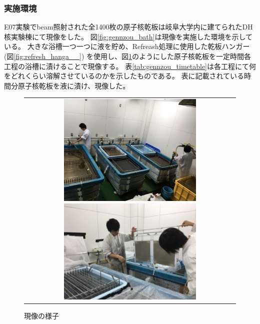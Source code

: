 \documentclass[12pt,a4paper]{jarticle}
\begin{document}
\subsubsection{実施環境}
E07実験でbeam照射された全1400枚の原子核乾板は岐阜大学内に建てられたDH核実験棟にて現像をした。
図\ref{fig:gennzou_bath}は現像を実施した環境を示している。
大きな浴槽一つ一つに液を貯め、Refreash処理に使用した乾板ハンガー(図\ref{fig:refresh_hanga__})
を使用し、図\ref{fig:emulsion_turusi}のようにした原子核乾板を一定時間各工程の浴槽に漬けることで現像する。
表\ref{tab:gennzou_timetable}は各工程にて何をどれくらい溶解させているのかを示したものである。
表に記載されている時間分原子核乾板を液に漬け、現像した。
\begin{figure}[htbp]
  \centering
      \begin{tabular}{c}
        \begin{minipage}{0.5\hsize}
          \centering
            \includegraphics[clip, width=70mm]{gennzou_condition.png}
            \hspace{1.6cm} 
            \caption{現像環境\label{fig:gennzou_bath}}
        \end{minipage}
        
        \begin{minipage}{0.5\hsize}
          \centering
            \includegraphics[clip, width=70mm]{gennzou_turusi.png}
            \hspace{1.6cm} 
            \caption{現像の様子\label{fig:emulsion_turusi}}
        \end{minipage}
    
      \end{tabular}
\end{figure}
\end{document}
